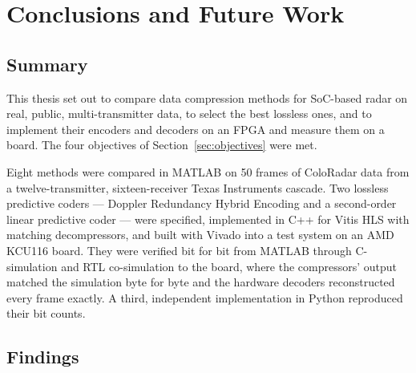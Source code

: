 \chapter{Conclusions and Future Work}
\label{ch:conclusion}

\section{Summary}

This thesis set out to compare data compression methods for SoC-based radar on
real, public, multi-transmitter data, to select the best lossless ones, and to
implement their encoders and decoders on an FPGA and measure them on a board.
The four objectives of Section~\ref{sec:objectives} were met.

Eight methods were compared in MATLAB on 50 frames of ColoRadar data from a
twelve-transmitter, sixteen-receiver Texas Instruments cascade. Two lossless
predictive coders --- Doppler Redundancy Hybrid Encoding and a second-order
linear predictive coder --- were specified, implemented in C++ for Vitis HLS
with matching decompressors, and built with Vivado into a test system on an AMD
KCU116 board. They were verified bit for bit from MATLAB through C-simulation
and RTL co-simulation to the board, where the compressors' output matched the
simulation byte for byte and the hardware decoders reconstructed every frame
exactly.
A third, independent implementation in Python reproduced their bit counts.

\section{Findings}

